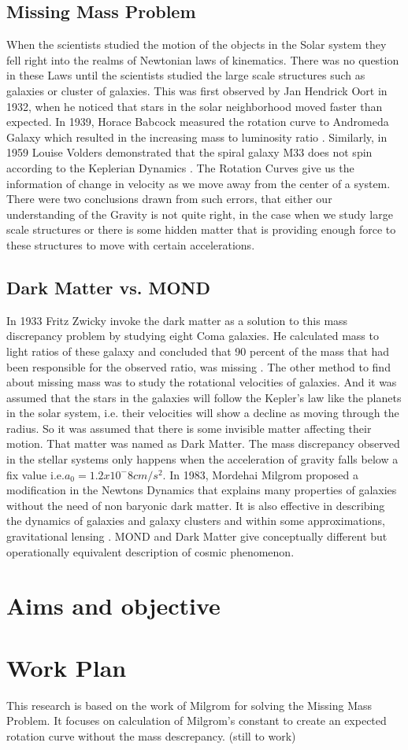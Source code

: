 \subsection{Missing Mass Problem}
When the scientists studied the motion of the objects in the Solar system they fell right into the realms of Newtonian laws of kinematics. There was no question in these Laws until the scientists studied the large scale structures such as galaxies or cluster of galaxies. This was first observed by Jan Hendrick Oort in 1932, when he noticed that stars in the solar neighborhood moved faster than expected. In 1939, Horace Babcock measured the rotation curve to Andromeda Galaxy which resulted in the increasing mass to luminosity ratio \cite{missing_mass}. Similarly, in 1959 Louise Volders demonstrated that the spiral galaxy M33 does not spin according to the Keplerian Dynamics \cite{mm}. The Rotation Curves give us the information of change in velocity as we move away from the center of a system. There were two conclusions drawn from such errors, that either our understanding of the Gravity is not quite right, in the case when we study large scale structures or there is some hidden matter that is providing enough force to these structures to move with certain accelerations.

\subsection{Dark Matter vs. MOND}
   In 1933 Fritz Zwicky invoke the dark matter as a solution to this mass discrepancy problem by studying eight Coma galaxies. He calculated mass to light ratios of these galaxy and concluded that 90 percent of the mass that had been responsible for the observed ratio, was missing \cite{dm_3}. The other method to find about missing mass was to study the rotational velocities of galaxies. And it was assumed that the stars in the galaxies will follow the Kepler's law like the planets in the solar system, i.e. their velocities will show a decline as moving through the radius. So it was assumed that there is some invisible matter affecting their motion. That matter was named as Dark Matter.
\cite{mond} \cite{dm_1} \cite{dm_2} The mass discrepancy observed in the stellar systems only happens when the acceleration of gravity falls below a fix value i.e.$a_{0}= 1.2x10^-8 cm/s^2$.\cite{mond_1} In 1983, Mordehai Milgrom proposed a modification in the Newtons Dynamics that explains many properties of galaxies without  the need of non baryonic dark matter. It is also effective in describing the dynamics of galaxies and galaxy clusters and within some approximations, gravitational lensing \cite{mond_2} \cite{mond_3}. MOND and Dark Matter give conceptually different but operationally equivalent description of cosmic phenomenon.

\section{Aims and objective}

\section{Work Plan}
 This research is based on the work of Milgrom for solving the Missing Mass Problem. It focuses on calculation of Milgrom's constant to create an expected rotation curve without the mass descrepancy.
(still to work)
